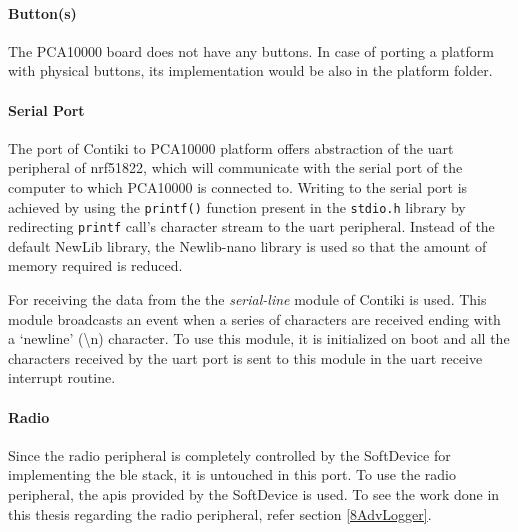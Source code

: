 \paragraph{Button(s)}
The PCA10000 board does not have any buttons. In case of porting a platform with physical buttons, its implementation would be also in the platform folder.

\paragraph{Serial Port}
The port of Contiki to PCA10000 platform offers abstraction of the \gls{uart} peripheral of nrf51822, which will communicate with the serial port of the computer to which PCA10000 is connected to. Writing to the serial port is achieved by using the \texttt{printf()} function present in the \texttt{stdio.h} library by redirecting \texttt{printf} call's character stream to the \gls{uart} peripheral. Instead of the default NewLib library, the Newlib-nano library is used so that the amount of memory required is reduced.

For receiving the data from the the \emph{serial-line} module of Contiki is used. This module broadcasts an event when a series of characters are received ending with a `newline' (\textbackslash n) character. To use this module, it is initialized on boot and all the characters received by the \gls{uart} port is sent to this module in the \gls{uart} receive interrupt routine.

\paragraph{Radio} 

Since the radio peripheral is completely controlled by the SoftDevice for implementing the \gls{ble} stack, it is untouched in this port. To use the radio peripheral, the \glspl{api} provided by the SoftDevice is used. To see the work done in this thesis regarding the radio peripheral, refer section \ref{8AdvLogger}.
